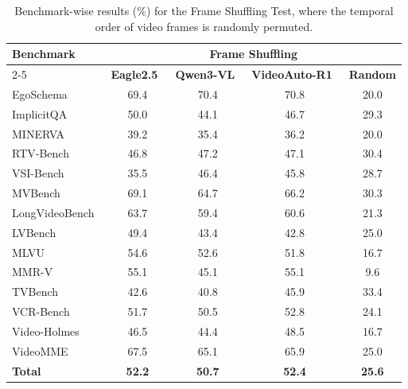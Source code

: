         \begin{table}[h]
        \centering
        \caption{Benchmark-wise results (\%) for the Frame Shuffling Test, where the temporal order of video frames is randomly permuted.}
        \footnotesize
        \setlength{\tabcolsep}{4pt}
        \begin{tabular}{lcccc}
        \toprule
        \multirow{2}{*}{\textbf{Benchmark}} & \multicolumn{4}{c}{\scriptsize \textbf{Frame Shuffling}} \\
        \cmidrule(lr){2-5}
         & {\scriptsize \textbf{Eagle2.5~\cite{eagle25}}} & {\scriptsize \textbf{Qwen3-VL}~\cite{qwem3_vl}} & {\scriptsize \textbf{VideoAuto-R1}~\cite{videoautor1}} & {\scriptsize \textbf{Random}} \\
        \midrule
        EgoSchema~\cite{egoschema} & 69.4 & 70.4 & 70.8 & 20.0 \\
        ImplicitQA~\cite{implicitqa} & 50.0 & 44.1 & 46.7 & 29.3 \\
        MINERVA~\cite{minerva} & 39.2 & 35.4 & 36.2 & 20.0 \\
        RTV-Bench~\cite{rtvbench} & 46.8 & 47.2 & 47.1 & 30.4 \\
        VSI-Bench~\cite{vsibench} & 35.5 & 46.4 & 45.8 & 28.7 \\
        MVBench~\cite{mvbench} & 69.1 & 64.7 & 66.2 & 30.3 \\
        LongVideoBench~\cite{longvideobench} & 63.7 & 59.4 & 60.6 & 21.3 \\
        LVBench~\cite{lvbench} & 49.4 & 43.4 & 42.8 & 25.0 \\
        MLVU~\cite{mlvu} & 54.6 & 52.6 & 51.8 & 16.7 \\
        MMR-V~\cite{mmrv} & 55.1 & 45.1 & 55.1 & 9.6 \\
        TVBench~\cite{tvbench} & 42.6 & 40.8 & 45.9 & 33.4 \\
        VCR-Bench~\cite{vcrbench} & 51.7 & 50.5 & 52.8 & 24.1 \\
        Video-Holmes~\cite{videoholmes} & 46.5 & 44.4 & 48.5 & 16.7 \\
        VideoMME~\cite{videomme} & 67.5 & 65.1 & 65.9 & 25.0 \\
        \midrule
        \textbf{Total} & \textbf{52.2} & \textbf{50.7} & \textbf{52.4} & \textbf{25.6} \\
        \bottomrule
        \end{tabular}
        \label{tab:shuffling}
        \end{table}

